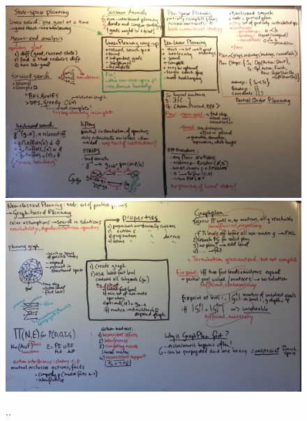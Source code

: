 \documentclass[a4paper,11pt,notitlepage]{article}
\begin{document}
\begin{figure}[ht!]
\centering
\includegraphics[width=180mm]{img/3.jpg}
\includegraphics[width=180mm]{img/4.jpg}
\caption{..}
\label{ideas}
\end{figure}
\end{document}
